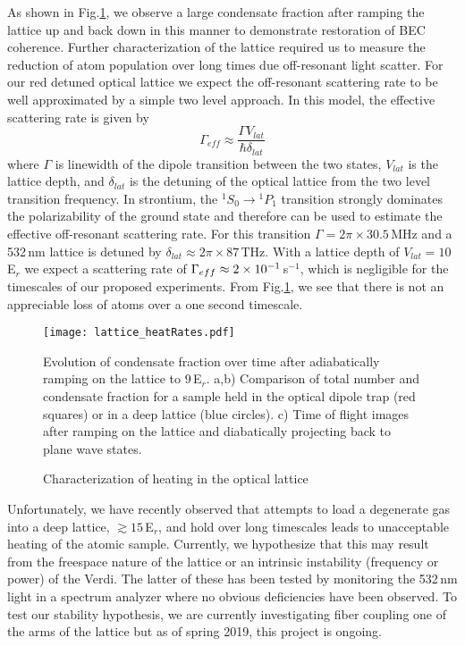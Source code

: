 As shown in Fig.\;\ref{fig:heatingRates}, we observe a large condensate fraction after ramping the lattice up and back down in this manner to demonstrate restoration of BEC coherence.
Further characterization of the lattice required us to measure the reduction of atom population over long times due off-resonant light scatter.
For our red detuned optical lattice we expect the off-resonant scattering rate to be well approximated by a simple two level approach. In this model, the effective scattering rate is given by \cite{Jaksch2005}
	\begin{equation} \label{eq:offResScatter}
		\Gamma_{eff} \approx \frac{\Gamma V_{lat}}{\hbar \delta_{lat}}
	\end{equation}
where $\Gamma$ is linewidth of the dipole transition between the two states, $V_{lat}$ is the lattice depth, and $\delta_{lat}$ is the detuning of the optical lattice from the two level transition frequency.
In strontium, the $^1S_0\!\rightarrow\!^1P_1$ transition strongly dominates the polarizability of the ground state and therefore can be used to estimate the effective off-resonant scattering rate.
For this transition $\Gamma = 2 \pi \times 30.5\,$MHz and a 532\,nm lattice is detuned by $\delta_{lat} \approx 2 \pi \times 87\,$THz.
With a lattice depth of $V_{lat}=10\,$E$_r$ we expect a scattering rate of $\Gamma_{eff} \approx 2\times 10^{-1}\,$s$^{-1}$, which is negligible for the timescales of our proposed experiments.
From Fig.\;\ref{fig:heatingRates}, we see that there is not an appreciable loss of atoms over a one second timescale.
	\begin{figure}
	\centerline{
		\texttt{[image: lattice\_heatRates.pdf]}}
		\caption{Characterization of heating in the optical lattice}{Evolution of condensate fraction over time after adiabatically ramping on the lattice to 9\,E$_r$. a,b) Comparison of total number and condensate fraction for a sample held in the optical dipole trap (red squares) or in a deep lattice (blue circles). c) Time of flight images after ramping on the lattice and diabatically projecting back to plane wave states.}
		 \label{fig:heatingRates}
	\end{figure}
Unfortunately, we have recently observed that attempts to load a degenerate gas into a deep lattice, $\gtrsim 15$\,E$_r$, and hold over long timescales leads to unacceptable heating of the atomic sample.
Currently, we hypothesize that this may result from the freespace nature of the lattice or an intrinsic instability (frequency or power) of the Verdi.
The latter of these has been tested by monitoring the 532\,nm light in a spectrum analyzer where no obvious deficiencies have been observed.
To test our stability hypothesis, we are currently investigating fiber coupling one of the arms of the lattice but as of spring 2019, this project is ongoing.

